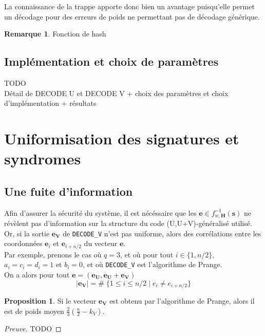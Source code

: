 \documentclass[12pt]{article}
\theoremstyle{definition}
\newtheorem{remarque}[thm]{Remarque}
\newtheorem{propo}[thm]{Proposition}
\begin{document}
La connaissance de la trappe apporte donc bien un avantage puisqu'elle permet un décodage pour des erreurs de poids ne permettant pas de décodage générique. 

\begin{remarque} Fonction de hash
\end{remarque}

\subsection{Implémentation et choix de paramètres}
TODO \\
Détail de DECODE U et DECODE V + choix des paramètres et choix d'implémentation + résultats \\

\section{Uniformisation des signatures et syndromes}

\subsection{Une fuite d'information}
Afin d'assurer la sécurité du système, il est nécéssaire que les $\mathbf{e} \in f_{w,\mathbf{H}}^{-1}(\mathbf{s})$ ne révèlent pas d'information sur la structure du code (U,U+V)-généralisé utilisé. \\
Or, si la sortie $\mathbf{e_V}$ de \verb|DECODE_V| n'est pas uniforme, alors des corrélations entre les coordonnées $\mathbf{e}_i$ et $\mathbf{e}_{i+n/2}$ du vecteur $\mathbf{e}$. \\
Par exemple, prenons le cas où $q=3$, et où pour tout $i \in \{1,n/2\}$, $a_i = c_i = d_i = 1$ et $b_i = 0$, et où \verb|DECODE_V| est l'algorithme de Prange. \\
On a alors pour tout $\mathbf{e} = (\mathbf{e_U},\mathbf{e_U}+\mathbf{e_V})$
$$ |\mathbf{e_V}| = \# \; \{1  \leq i \leq n/2 \;|\; e_i \neq e_{i+n/2}\}$$

\begin{propo}
Si le vecteur $\mathbf{e_V}$ est obtenu par l'algorithme de Prange, alors il est de poids moyen $\frac{2}{3}(\frac{n}{2}-k_V)$.
\end{propo}

\begin{proof}[Preuve]
TODO
\end{proof}
\end{document}
